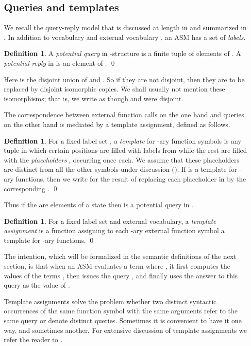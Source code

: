 \documentclass{LMCS}
\theoremstyle{definition}
\newtheorem{df}[thm]{Definition}
\begin{document}
\subsection{Queries and templates}

We recall the query-reply model that is discussed at length in
\cite{oa1,oa2} and summarized in \cite{ga1}.  In addition to vocabulary
 and external vocabulary , an ASM has a set  of
\emph{labels}.

\begin{df}
A \emph{potential query} in -structure  is a finite
tuple of elements of .  A \emph{potential reply} in
 is an element of . \qed\end{df}

Here  is the disjoint union of  and .
So if they are not disjoint, then they are to be replaced by
disjoint isomorphic copies.  We shall usually not mention these
isomorphisms; that is, we write as though  and  were
disjoint.

The correspondence between external function calls on the one hand
and queries on the other hand is mediated by a template assignment,
defined as follows.

\begin{df}
For a fixed label set , a \emph{template} for -ary
  function symbols is any tuple in which certain positions are filled
  with labels from  while the rest are filled with the
  \emph{placeholders} , occurring once
  each.  We assume that these placeholders are distinct from all
  the other symbols under discussion ().
  If  is a template for -ary functions, then we write
   for the result of replacing each placeholder
   in  by the corresponding .
  \qed\end{df}

Thus if the  are elements of a state  then
 is a potential query in .

\begin{df}
For a fixed label set and external vocabulary, a \emph{template
assignment} is a function assigning to each -ary external
function symbol  a template  for -ary functions.
\qed\end{df}

The intention, which will be formalized in the semantic definitions
of the next section, is that when an ASM evaluates a term
 where , it first computes the
values  of the terms , then issues the query , and finally uses the answer to this query as the
value of .

Template assignments solve the problem whether two distinct syntactic
occurrences of the same function symbol with the same arguments refer
to the same query or denote distinct queries.  Sometimes it is
convenient to have it one way, and sometimes another.  For extensive
discussion of template assignments we refer the reader to \cite{oa2}.
\end{document}
